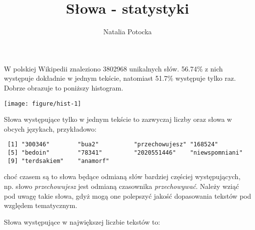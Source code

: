 \documentclass[12pt, twoside, openany]{report}\usepackage[]{graphicx}\usepackage[]{color}
\author{Natalia Potocka}
\title{Słowa - statystyki}
\makeatletter
\def\maxwidth{ %
  \ifdim\Gin@nat@width>\linewidth
    \linewidth
  \else
    \Gin@nat@width
  \fi
}
\newenvironment{kframe}{%
 \def\at@end@of@kframe{}%
 \ifinner\ifhmode%
  \def\at@end@of@kframe{\end{minipage}}%
  \begin{minipage}{\columnwidth}%
 \fi\fi%
 \def\FrameCommand##1{\hskip\@totalleftmargin \hskip-\fboxsep
 \colorbox{shadecolor}{##1}\hskip-\fboxsep
     \hskip-\linewidth \hskip-\@totalleftmargin \hskip\columnwidth}%
 \MakeFramed {\advance\hsize-\width
   \@totalleftmargin\z@ \linewidth\hsize
   \@setminipage}}%
 {\par\unskip\endMakeFramed%
 \at@end@of@kframe}
\newenvironment{knitrout}{}{} %
\theoremstyle{plain}
\makeatother
\begin{document}
\maketitle


\newpage







W polskiej Wikipedii znaleziono 3802968 unikalnych słów. 56.74\% z nich występuje dokładnie w jednym tekście, natomiast 51.7\% występuje tylko raz. Dobrze obrazuje to poniższy histogram.

\begin{knitrout}
\color{fgcolor}
\texttt{[image: figure/hist-1]} 

\end{knitrout}

Słowa występujące tylko w jednym tekście to zazwyczaj liczby oraz słowa w obcych językach, przykładowo:

\begin{knitrout}
\color{fgcolor}\begin{kframe}
\begin{verbatim}
 [1] "300346"        "bua2"          "przechowujesz" "168524"       
 [5] "bedoin"        "78341"         "2020551446"    "niewspomniani"
 [9] "terdsakiem"    "anamorf"      
\end{verbatim}
\end{kframe}
\end{knitrout}

choć czasem są to słowa będące odmianą słów bardziej częściej występujących, np. słowo \emph{przechowujesz} jest odmianą czasownika \emph{przechowywać}. Należy wziąć pod uwagę takie słowa, gdyż mogą one polepszyć jakość dopasowania tekstów pod względem tematycznym.

% 
% 
% 

Słowa występujące w największej liczbie tekstów to:\\
\end{document}
